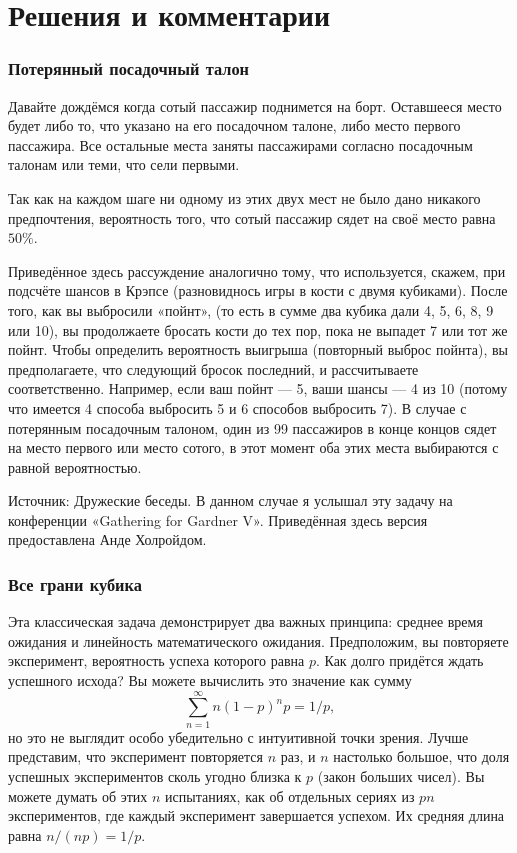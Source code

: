 \section*{Решения и комментарии}

\subsubsection*{Потерянный посадочный талон}%

Давайте дождёмся когда сотый пассажир поднимется на борт. 
Оставшееся место будет либо то, что указано на его посадочном талоне, либо место первого пассажира.
Все остальные места заняты пассажирами согласно посадочным талонам или теми, что сели первыми.

Так как на каждом шаге ни одному из этих двух мест не было дано никакого предпочтения, вероятность того, что сотый пассажир сядет на своё место равна $50\%$.
\heart

Приведённое здесь рассуждение аналогично тому, что используется, скажем, при подсчёте шансов в Крэпсе (разновиднось игры в кости с двумя кубиками).
После того, как вы выбросили «пойнт»,
(то есть в сумме два кубика дали 4, 5, 6, 8, 9 или 10), вы продолжаете бросать кости до тех пор, пока не выпадет 7 или тот же пойнт.
Чтобы определить вероятность выигрыша (повторный выброс пойнта), вы предполагаете, что следующий бросок последний, и рассчитываете соответственно.
Например, если ваш пойнт --- 5, ваши шансы --- 4 из 10 (потому что имеется 4 способа выбросить 5 и 6 способов выбросить 7).
В случае с потерянным посадочным талоном, один из 99 пассажиров в конце концов сядет на место первого или место сотого, в этот момент оба этих места выбираются с равной вероятностью. 

\medskip

Источник: Дружеские беседы.
В данном случае я услышал эту задачу на конференции «Gathering for Gardner V».
Приведённая здесь версия предоставлена Анде Холройдом. %

\subsubsection*{Все грани кубика}%

Эта классическая задача демонстрирует два важных принципа: среднее время ожидания и линейность математического ожидания. %
Предположим, вы повторяете эксперимент, вероятность успеха которого равна $p$.
Как долго придётся ждать успешного исхода? Вы можете вычислить это значение как сумму
\[\sum_{n=1}^\infty n(1-p)^np=1/p,\]
но это не выглядит особо убедительно с интуитивной точки зрения.
Лучше представим, что эксперимент повторяется $n$ раз, и $n$ настолько большое, что доля успешных экспериментов сколь угодно близка к $p$ (закон больших чисел).
Вы можете думать об этих $n$ испытаниях, как об отдельных сериях из $pn$ экспериментов, где каждый эксперимент завершается успехом.
Их средняя длина равна $n/(np)=1/p$.

